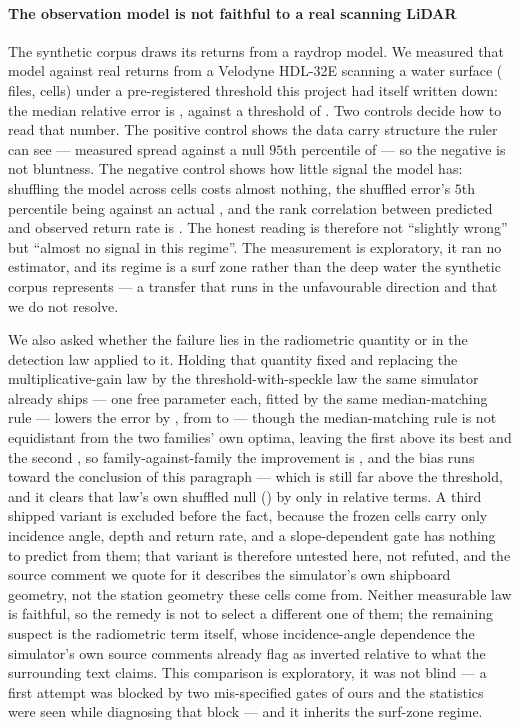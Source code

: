 \documentclass[review]{elsarticle}
\begin{document}
\paragraph{The observation model is not faithful to a real scanning LiDAR}
The synthetic corpus draws its returns from a raydrop model. We measured that model
against real returns from a Velodyne HDL-32E scanning a water surface
(\HThreeFiles{} files, \HThreeCells{} cells) under a pre-registered threshold this
project had itself written down: the median relative error is \HThreeMRE{}, against a
threshold of \HThreeThresh{}. Two controls decide how to read that number. The
positive control shows the data carry structure the ruler can see --- measured
spread \HThreePosSpread{} against a null $95$th percentile of \HThreePosNull{} ---
so the negative is not bluntness. The negative control shows how little signal the
model has: shuffling the model across cells costs almost nothing, the shuffled
error's $5$th percentile being \HThreeShuffled{} against an actual \HThreeMRE{}, and
the rank correlation between predicted and observed return rate is
\HThreeSpearman{}. The honest reading is therefore not ``slightly wrong'' but
``almost no signal in this regime''. The measurement is exploratory, it ran no
estimator, and its regime is a surf zone rather than the deep water the synthetic
corpus represents --- a transfer that runs in the unfavourable direction and that we
do not resolve.

We also asked whether the failure lies in the radiometric quantity or in the
detection law applied to it. Holding that quantity fixed and replacing the
multiplicative-gain law by the threshold-with-speckle law the same simulator already
ships --- one free parameter each, fitted by the same median-matching rule --- lowers
the error by \HThreeCRel{}, from \HThreeCMreA{} to \HThreeCMreC{} --- though the
median-matching rule is not equidistant from the two families' own optima, leaving the
first \HThreeCFitBiasA{} above its best and the second \HThreeCFitBiasC{}, so
family-against-family the improvement is \HThreeCRelFair{}, and the bias runs toward
the conclusion of this paragraph --- which is still far
above the threshold, and it clears that law's own shuffled null (\HThreeCShufC{}) by
only \HThreeCShufGap{} in relative terms.
A third shipped variant is excluded before the fact, because the frozen cells carry
only incidence angle, depth and return rate, and a slope-dependent gate has nothing
to predict from them; that variant is therefore untested here, not refuted, and the
source comment we quote for it describes the simulator's own shipboard geometry,
not the station geometry these cells come from. Neither measurable law is faithful,
so the remedy is not to select a different one of them; the remaining suspect is the radiometric term itself, whose
incidence-angle dependence the simulator's own source comments already flag as
inverted relative to what the surrounding text claims. This comparison is exploratory,
it was not blind --- a first attempt was blocked by two mis-specified gates of ours and
the statistics were seen while diagnosing that block --- and it inherits the surf-zone
regime.
\end{document}
